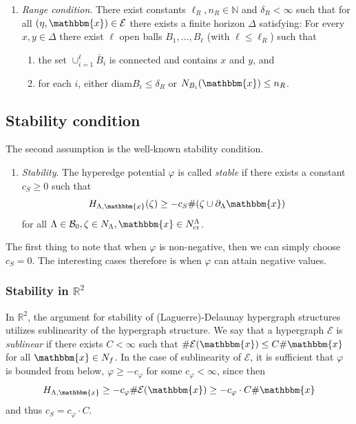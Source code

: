 \documentclass[12pt,a4paper]{article}
\theoremstyle{definition}
\theoremstyle{remark}
\theoremstyle{theorem}
\newcommand{\x}{\mathbbm{x}}
\begin{document}
\begin{enumerate}[\textbf{(R)}]
	\item \textit{Range condition}. There exist constants $\ell_R,n_R \in \mathbb N$ and $\delta_R < \infty$ such that for all $(\eta,\x) \in \mathcal E$ there exists a finite horizon $\Delta$ satisfying: For every $x,y \in \Delta$ there exist $\ell$ open balls $B_1, \dots, B_\ell$ (with $\ell \leq \ell_R$) such that
	\begin{enumerate}[-]
		\item the set $\cup^\ell_{i=1} \bar B_i$ is connected and contains $x$ and $y$, and 
		\item for each $i$, either $\text{diam} B_i \leq \delta_R$ or $N_{B_i}(\x) \leq n_R$.
	\end{enumerate}
\end{enumerate}

\subsection{Stability condition}
The second assumption is the well-known stability condition. 
\begin{enumerate}[\textbf{(S)}] 
	\item \textit{Stability}. The hyperedge potential $\varphi$ is called \textit{stable} if there exists a constant $c_S \geq 0$ such that 
$$H_{\Lambda,\x}(\zeta) \geq -c_S \#(\zeta \cup \partial_\Lambda \x)$$
for all $\Lambda \in \mathcal B_0, \zeta \in N_\Lambda, \x \in N^\Lambda_{\text{cr}}$.
\end{enumerate}

The first thing to note that when $\varphi$ is non-negative, then we can simply choose $c_S = 0$. The interesting cases therefore is when $\varphi$ can attain negative values.\newline

\subsubsection{Stability in $\mathbb R^2$}
In $\mathbb R^2$, the argument for stability of (Laguerre)-Delaunay hypergraph structures utilizes sublinearity of the hypergraph structure. We say that a hypergraph $\mathcal E$ is \textit{sublinear} if there exists $C < \infty$ such that $\# \mathcal E(\x) \leq C \# \x$ for all $\x \in N_f$. In the case of sublinearity of $\mathcal E$, it is sufficient that $\varphi$ is bounded from below, $\varphi \geq - c_\varphi$ for some $c_\varphi < \infty$, since then 
$$H_{\Lambda,\x} \geq -c_\varphi \#\mathcal E(\x) \geq -c_\varphi\cdot C \# \x$$ 
and thus $c_S = c_\varphi \cdot C$.
\end{document}
